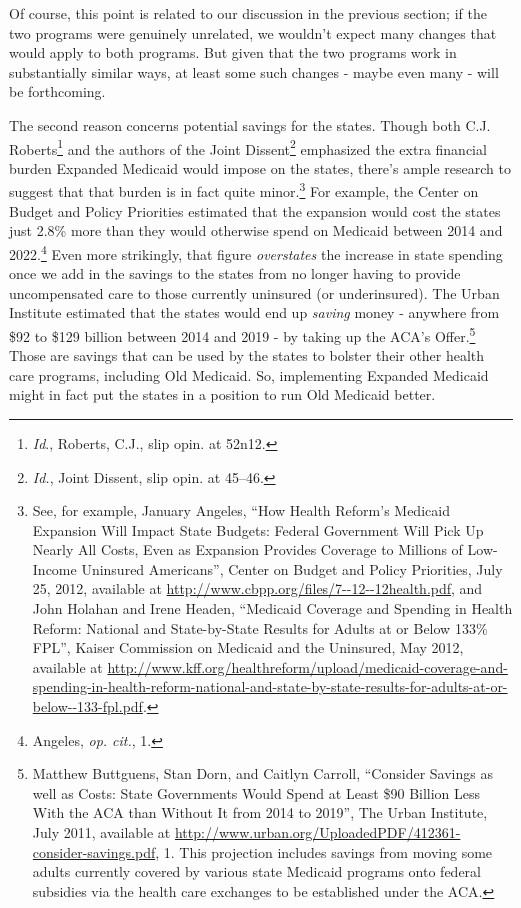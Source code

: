 \documentclass[
  11pt,
  letterpaper,
  DIV=11,
  numbers=noendperiod,
  twoside]{scrartcl}
\begin{document}
Of course, this point is related to our discussion in the previous
section; if the two programs were genuinely unrelated, we wouldn't
expect many changes that would apply to both programs. But given that
the two programs work in substantially similar ways, at least some such
changes - maybe even many - will be forthcoming.

The second reason concerns potential savings for the states. Though both
C.J. Roberts\footnote{\emph{Id}., Roberts, C.J., slip opin. at 52n12.}
and the authors of the Joint Dissent\footnote{\emph{Id.}, Joint Dissent,
  slip opin. at 45--46.} emphasized the extra financial burden Expanded
Medicaid would impose on the states, there's ample research to suggest
that that burden is in fact quite minor.\footnote{See, for example,
  January Angeles, ``How Health Reform's Medicaid Expansion Will Impact
  State Budgets: Federal Government Will Pick Up Nearly All Costs, Even
  as Expansion Provides Coverage to Millions of Low-Income Uninsured
  Americans'', Center on Budget and Policy Priorities, July 25, 2012,
  available at \url{http://www.cbpp.org/files/7--12--12health.pdf}, and
  John Holahan and Irene Headen, ``Medicaid Coverage and Spending in
  Health Reform: National and State-by-State Results for Adults at or
  Below 133\% FPL'', Kaiser Commission on Medicaid and the Uninsured,
  May 2012, available at
  \url{http://www.kff.org/healthreform/upload/medicaid-coverage-and-spending-in-health-reform-national-and-state-by-state-results-for-adults-at-or-below--133-fpl.pdf}.}
For example, the Center on Budget and Policy Priorities estimated that
the expansion would cost the states just 2.8\% more than they would
otherwise spend on Medicaid between 2014 and 2022.\footnote{Angeles,
  \emph{op. cit.}, 1.} Even more strikingly, that figure
\emph{overstates} the increase in state spending once we add in the
savings to the states from no longer having to provide uncompensated
care to those currently uninsured (or underinsured). The Urban Institute
estimated that the states would end up \emph{saving} money - anywhere
from \$92 to \$129 billion between 2014 and 2019 - by taking up the
ACA's Offer.\footnote{Matthew Buttguens, Stan Dorn, and Caitlyn Carroll,
  ``Consider Savings as well as Costs: State Governments Would Spend at
  Least \$90 Billion Less With the ACA than Without It from 2014 to
  2019'', The Urban Institute, July 2011, available at
  \url{http://www.urban.org/UploadedPDF/412361-consider-savings.pdf}, 1.
  This projection includes savings from moving some adults currently
  covered by various state Medicaid programs onto federal subsidies via
  the health care exchanges to be established under the ACA.} Those are
savings that can be used by the states to bolster their other health
care programs, including Old Medicaid. So, implementing Expanded
Medicaid might in fact put the states in a position to run Old Medicaid
better.
\end{document}
